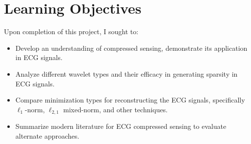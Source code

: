 \section{Learning Objectives}

Upon completion of this project, I sought to:

\begin{itemize}
    \item Develop an understanding of compressed sensing, demonstrate its application in ECG signals.
    \item Analyze different wavelet types and their efficacy in generating sparsity in ECG signals.
    \item Compare minimization types for reconstructing the ECG signals, specifically \(\ell_1\)-norm, \(\ell_{2,1}\) mixed-norm, and other techniques.
    \item Summarize modern literature for ECG compressed sensing to evaluate alternate approaches.
\end{itemize}
